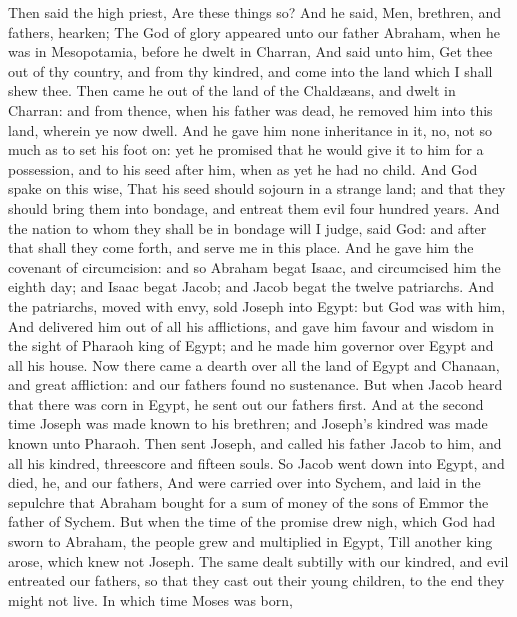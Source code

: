  Then said the high priest, Are these things so?
 And he said, Men, brethren, and fathers, hearken; The God
of glory appeared unto our father Abraham, when he was in Mesopotamia,
before he dwelt in Charran,  And said unto him, Get thee out
of thy country, and from thy kindred, and come into the land which I
shall shew thee.  Then came he out of the land of the
Chaldæans, and dwelt in Charran: and from thence, when his father was
dead, he removed him into this land, wherein ye now dwell. 
And he gave him none inheritance in it, no, not so much as to set his
foot on: yet he promised that he would give it to him for a possession,
and to his seed after him, when as yet he had no child.  And
God spake on this wise, That his seed should sojourn in a strange land;
and that they should bring them into bondage, and entreat them evil four
hundred years.  And the nation to whom they shall be in
bondage will I judge, said God: and after that shall they come forth,
and serve me in this place.  And he gave him the covenant of
circumcision: and so Abraham begat Isaac, and circumcised him the eighth
day; and Isaac begat Jacob; and Jacob begat the twelve patriarchs.
 And the patriarchs, moved with envy, sold Joseph into
Egypt: but God was with him,  And delivered him out of all
his afflictions, and gave him favour and wisdom in the sight of Pharaoh
king of Egypt; and he made him governor over Egypt and all his house.
 Now there came a dearth over all the land of Egypt and
Chanaan, and great affliction: and our fathers found no sustenance.
 But when Jacob heard that there was corn in Egypt, he sent
out our fathers first.  And at the second time Joseph was
made known to his brethren; and Joseph's kindred was made known unto
Pharaoh.  Then sent Joseph, and called his father Jacob to
him, and all his kindred, threescore and fifteen souls.  So
Jacob went down into Egypt, and died, he, and our fathers, 
And were carried over into Sychem, and laid in the sepulchre that
Abraham bought for a sum of money of the sons of Emmor the father of
Sychem.  But when the time of the promise drew nigh, which
God had sworn to Abraham, the people grew and multiplied in Egypt,
 Till another king arose, which knew not Joseph.
 The same dealt subtilly with our kindred, and evil
entreated our fathers, so that they cast out their young children, to
the end they might not live.  In which time Moses was born,
